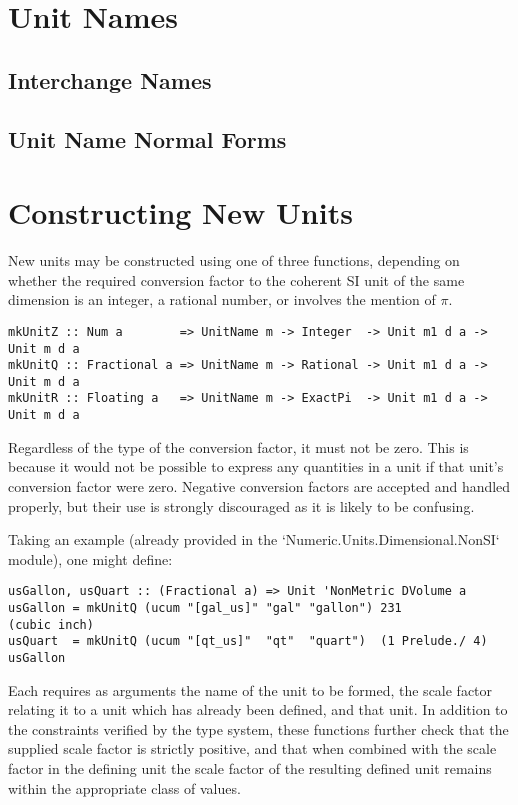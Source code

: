 \documentclass[11pt]{report}
\begin{document}
\section{Unit Names}

\subsection{Interchange Names}
\subsection{Unit Name Normal Forms}

\section{Constructing New Units} \label{constructing-new-units}

New units may be constructed using one of three functions, depending on whether the required conversion factor to the coherent
SI unit of the same dimension is an integer, a rational number, or involves the mention of $ \pi $.

\begin{lstlisting}
mkUnitZ :: Num a        => UnitName m -> Integer  -> Unit m1 d a -> Unit m d a
mkUnitQ :: Fractional a => UnitName m -> Rational -> Unit m1 d a -> Unit m d a
mkUnitR :: Floating a   => UnitName m -> ExactPi  -> Unit m1 d a -> Unit m d a
\end{lstlisting}

Regardless of the type of the conversion factor, it must not be zero. This is because it would not be possible
to express any quantities in a unit if that unit's conversion factor were zero. Negative conversion factors are accepted
and handled properly, but their use is strongly discouraged as it is likely to be confusing.

Taking an example (already provided in the `Numeric.Units.Dimensional.NonSI` module), one might define:

\begin{lstlisting}
usGallon, usQuart :: (Fractional a) => Unit 'NonMetric DVolume a
usGallon = mkUnitQ (ucum "[gal_us]" "gal" "gallon") 231             (cubic inch)
usQuart  = mkUnitQ (ucum "[qt_us]"  "qt"  "quart")  (1 Prelude./ 4) usGallon
\end{lstlisting}

Each requires as arguments the name of the unit to be formed, the scale factor relating it to a unit which has already been defined,
and that unit. In addition to the constraints verified by the type system, these functions further check that the supplied scale factor is
strictly positive, and that when combined with the scale factor in the defining unit the scale factor of the resulting defined unit remains
within the appropriate class of values.
\end{document}
